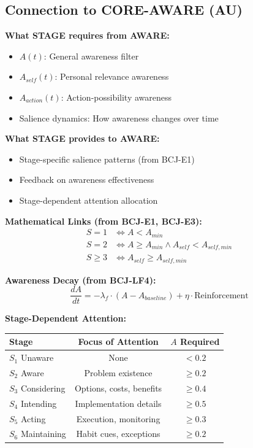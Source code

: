 \subsection{Connection to CORE-AWARE (AU)}

\begin{tcolorbox}[colback=blue!5!white, colframe=blue!75!black,
    title=Integration: STAGE $\leftrightarrow$ AWARE]
\textbf{What STAGE requires from AWARE:}
\begin{itemize}[nosep]
\item $A(t)$: General awareness filter
\item $A_{self}(t)$: Personal relevance awareness
\item $A_{action}(t)$: Action-possibility awareness
\item Salience dynamics: How awareness changes over time
\end{itemize}

\textbf{What STAGE provides to AWARE:}
\begin{itemize}[nosep]
\item Stage-specific salience patterns (from BCJ-E1)
\item Feedback on awareness effectiveness
\item Stage-dependent attention allocation
\end{itemize}

\textbf{Mathematical Links (from BCJ-E1, BCJ-E3):}
\begin{align}
S = 1 &\Leftrightarrow A < A_{min} \\
S = 2 &\Leftrightarrow A \geq A_{min} \land A_{self} < A_{self,min} \\
S \geq 3 &\Leftrightarrow A_{self} \geq A_{self,min}
\end{align}

\textbf{Awareness Decay (from BCJ-LF4):}
\begin{equation}
\frac{dA}{dt} = -\lambda_f \cdot (A - A_{baseline}) + \eta \cdot \text{Reinforcement}
\end{equation}

\textbf{Stage-Dependent Attention:}
\begin{center}
\begin{tabular}{lcc}
\toprule
\textbf{Stage} & \textbf{Focus of Attention} & \textbf{$A$ Required} \\
\midrule
$S_1$ Unaware & None & $< 0.2$ \\
$S_2$ Aware & Problem existence & $\geq 0.2$ \\
$S_3$ Considering & Options, costs, benefits & $\geq 0.4$ \\
$S_4$ Intending & Implementation details & $\geq 0.5$ \\
$S_5$ Acting & Execution, monitoring & $\geq 0.3$ \\
$S_6$ Maintaining & Habit cues, exceptions & $\geq 0.2$ \\
\bottomrule
\end{tabular}
\end{center}
\end{tcolorbox}

